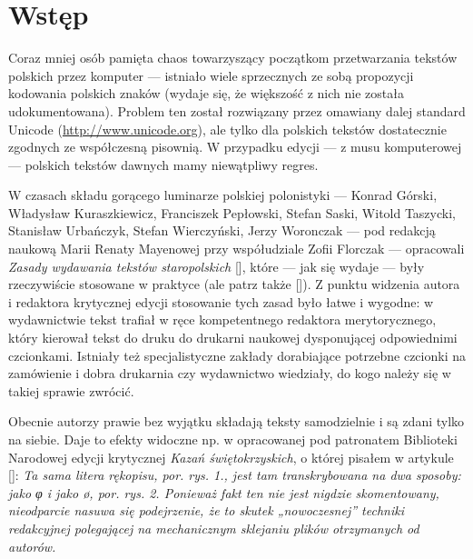
\renewcommand{\figurename}{Ilustracja}

\section{Wstęp}
\label{sec:wstp}

Coraz mniej osób pamięta chaos towarzyszący początkom przetwarzania
tekstów polskich przez komputer --- istniało wiele sprzecznych ze sobą
propozycji kodowania polskich znaków (wydaje się, że większość z nich
nie została udokumentowana). Problem ten został rozwiązany przez
omawiany dalej standard Unicode (\url{http://www.unicode.org}), ale
tylko dla polskich tekstów dostatecznie zgodnych ze współczesną
pisownią. W przypadku edycji --- z musu komputerowej --- polskich
tekstów dawnych mamy niewątpliwy regres.

W czasach składu gorącego luminarze polskiej polonistyki --- Konrad
Górski, Władysław Kuraszkiewicz, Franciszek Pepłowski, Stefan Saski,
Witold Taszycki, Stanisław Urbańczyk, Stefan Wierczyński, Jerzy
Woronczak --- pod redakcją naukową Marii Renaty Mayenowej przy
współudziale Zofii Florczak --- opracowali \textit{Zasady wydawania
  tekstów staropolskich} [\cite{Górski_Konrad__Zasady}], które --- jak
się wydaje --- były rzeczywiście stosowane w praktyce (ale patrz także
[\cite{kierkowicz10:_zasad}]). Z punktu widzenia autora i redaktora
krytycznej edycji stosowanie tych zasad było łatwe i wygodne: w
wydawnictwie tekst trafiał w ręce kompetentnego redaktora
merytorycznego, który kierował tekst do druku do drukarni naukowej
dysponującej odpowiednimi czcionkami. Istniały też specjalistyczne
zakłady dorabiające potrzebne czcionki na zamówienie i dobra drukarnia
czy wydawnictwo wiedziały, do kogo należy się w takiej sprawie
zwrócić.


Obecnie autorzy prawie bez wyjątku składają teksty samodzielnie i są
zdani tylko na siebie. Daje to efekty widoczne np. w opracowanej pod
patronatem Biblioteki Narodowej %
edycji krytycznej \textit{Kazań świętokrzyskich}, o której pisałem w
artykule [\cite[s.~57]{bc390}]: \textit{Ta sama litera rękopisu,
  por. rys. 1., jest tam transkrybowana na dwa sposoby: jako φ i jako
  ø, por. rys. 2. Ponieważ fakt ten nie jest nigdzie skomentowany,
  nieodparcie nasuwa się podejrzenie, że to skutek „nowoczesnej”
  techniki redakcyjnej polegającej na mechanicznym sklejaniu plików
  otrzymanych od autorów.}

